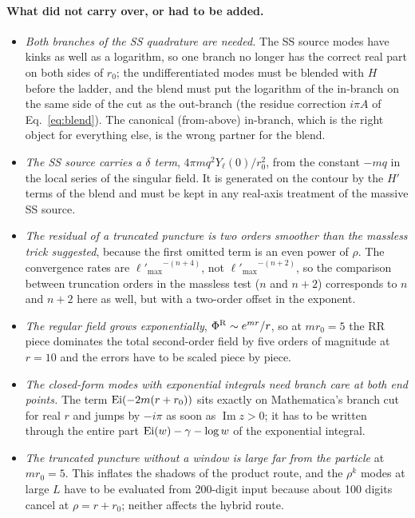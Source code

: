 \documentclass[11pt,a4paper]{article}
\renewcommand{\Im}{\operatorname{Im}}
\newcommand{\PhiR}{\Phi^{\rm R}}
\newcommand{\lpm}{{\ell'_{\max}}}
\begin{document}
\paragraph{What did not carry over, or had to be added.}
\begin{itemize}[leftmargin=*]
\item \emph{Both branches of the SS quadrature are needed.} The SS source modes have kinks as well as a logarithm, so one branch no longer has the correct real part on both sides of $r_0$; the undifferentiated modes must be blended with $H$ before the ladder, and the blend must put the logarithm of the in-branch on the same side of the cut as the out-branch (the residue correction $i\pi A$ of Eq.~\eqref{eq:blend}). The canonical (from-above) in-branch, which is the right object for everything else, is the wrong partner for the blend.
\item \emph{The SS source carries a $\delta$ term}, $4\pi mq^2Y_\ell(0)/r_0^2$, from the constant $-mq$ in the local series of the singular field. It is generated on the contour by the $H'$ terms of the blend and must be kept in any real-axis treatment of the massive SS source.
\item \emph{The residual of a truncated puncture is two orders smoother than the massless trick suggested}, because the first omitted term is an even power of $\rho$. The convergence rates are $\lpm^{-(n+4)}$, not $\lpm^{-(n+2)}$, so the comparison between truncation orders in the massless test ($n$ and $n+2$) corresponds to $n$ and $n+2$ here as well, but with a two-order offset in the exponent.
\item \emph{The regular field grows exponentially}, $\PhiR\sim e^{mr}/r$, so at $mr_0=5$ the RR piece dominates the total second-order field by five orders of magnitude at $r=10$ and the errors have to be scaled piece by piece.
\item \emph{The closed-form modes with exponential integrals need branch care at both end points.} The term ${\rm Ei}(-2m(r+r_0))$ sits exactly on Mathematica's branch cut for real $r$ and jumps by $-i\pi$ as soon as $\Im z>0$; it has to be written through the entire part ${\rm Ei}(w)-\gamma-\log w$ of the exponential integral.
\item \emph{The truncated puncture without a window is large far from the particle} at $mr_0=5$. This inflates the shadows of the product route, and the $\rho^k$ modes at large $L$ have to be evaluated from 200-digit input because about 100 digits cancel at $\rho=r+r_0$; neither affects the hybrid route.
\end{itemize}
\end{document}

